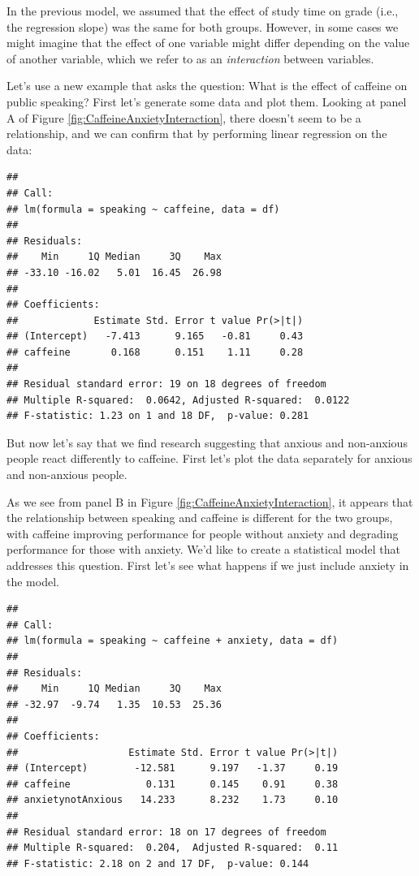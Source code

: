 \documentclass[12pt,]{book}
\theoremstyle{definition}
\theoremstyle{definition}
\theoremstyle{definition}
\theoremstyle{remark}
\begin{document}
In the previous model, we assumed that the effect of study time on grade (i.e., the regression slope) was the same for both groups. However, in some cases we might imagine that the effect of one variable might differ depending on the value of another variable, which we refer to as an \emph{interaction} between variables.

Let's use a new example that asks the question: What is the effect of caffeine on public speaking? First let's generate some data and plot them.
Looking at panel A of Figure \ref{fig:CaffeineAnxietyInteraction}, there doesn't seem to be a relationship, and we can confirm that by performing linear regression on the data:

\begin{verbatim}
## 
## Call:
## lm(formula = speaking ~ caffeine, data = df)
## 
## Residuals:
##    Min     1Q Median     3Q    Max 
## -33.10 -16.02   5.01  16.45  26.98 
## 
## Coefficients:
##             Estimate Std. Error t value Pr(>|t|)
## (Intercept)   -7.413      9.165   -0.81     0.43
## caffeine       0.168      0.151    1.11     0.28
## 
## Residual standard error: 19 on 18 degrees of freedom
## Multiple R-squared:  0.0642, Adjusted R-squared:  0.0122 
## F-statistic: 1.23 on 1 and 18 DF,  p-value: 0.281
\end{verbatim}

But now let's say that we find research suggesting that anxious and non-anxious people react differently to caffeine. First let's plot the data separately for anxious and non-anxious people.

As we see from panel B in Figure \ref{fig:CaffeineAnxietyInteraction}, it appears that the relationship between speaking and caffeine is different for the two groups, with caffeine improving performance for people without anxiety and degrading performance for those with anxiety. We'd like to create a statistical model that addresses this question. First let's see what happens if we just include anxiety in the model.

\begin{verbatim}
## 
## Call:
## lm(formula = speaking ~ caffeine + anxiety, data = df)
## 
## Residuals:
##    Min     1Q Median     3Q    Max 
## -32.97  -9.74   1.35  10.53  25.36 
## 
## Coefficients:
##                   Estimate Std. Error t value Pr(>|t|)
## (Intercept)        -12.581      9.197   -1.37     0.19
## caffeine             0.131      0.145    0.91     0.38
## anxietynotAnxious   14.233      8.232    1.73     0.10
## 
## Residual standard error: 18 on 17 degrees of freedom
## Multiple R-squared:  0.204,  Adjusted R-squared:  0.11 
## F-statistic: 2.18 on 2 and 17 DF,  p-value: 0.144
\end{verbatim}
\end{document}
